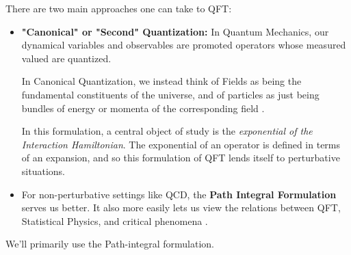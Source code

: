 \documentclass[11pt]{article}
\begin{document}
\vskip 0.5cm
There are two main approaches one can take to QFT:

\begin{itemize}
    \item \textbf{"Canonical" or "Second" Quantization:} In Quantum Mechanics, our dynamical variables and observables are promoted operators whose measured valued are quantized. 
    

    In Canonical Quantization, we instead think of Fields as being the fundamental constituents of the universe, and of particles as just being bundles of energy or momenta of the corresponding field \cite{Weinberg97}.
    
    In this formulation, a central object of study is the \emph{exponential of the Interaction Hamiltonian}. The exponential of an operator is defined in terms of an expansion, and so this formulation of QFT lends itself to perturbative situations. 
    
    \item For non-perturbative settings like QCD, the \textbf{Path Integral Formulation} serves us better. It also more easily lets us view the relations between QFT, Statistical Physics, and critical phenomena \cite{Maggiore05}. 
\end{itemize}

We'll primarily use the Path-integral formulation.




\end{document}
